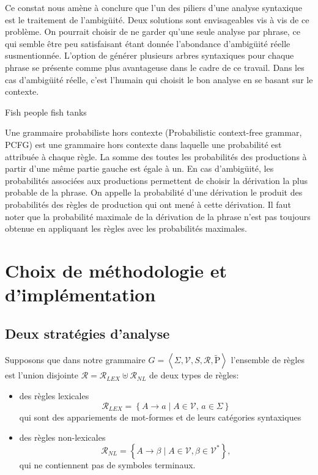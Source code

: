 \documentclass[12pt]{article}
\begin{document}
Ce constat nous am\`ene \`a conclure que l'un des piliers d'une
analyse syntaxique est le traitement de l'ambig\"uit\'e. Deux solutions sont
envisageables vis \`a vis de ce probl\`eme. On pourrait choisir de ne garder
qu'une seule analyse par phrase, ce qui semble \^etre peu satisfaisant \'etant
donn\'ee l'abondance d'ambig\"uit\'e r\'eelle susmentionn\'ee. L'option de
g\'en\'erer plusieurs arbres syntaxiques pour chaque phrase se pr\'esente comme
plus avantageuse dans le cadre de ce travail. Dans les cas d'ambig\"uit\'e
r\'eelle, c'est l'humain qui choisit le bon analyse en se basant sur le
contexte.

\begin{exe}
\ex Fish people fish tanks
\end{exe}

Une grammaire probabiliste hors contexte (Probabilistic context-free grammar,
PCFG) est une grammaire hors contexte dans laquelle une probabilit\'e est
attribu\'ee \`a chaque r\`egle. La somme des toutes les probabilit\'es des
productions \`a partir d'une m\^eme partie gauche est \'egale \`a un. 
En cas d'ambig\"uit\'e, les probabilit\'es associ\'ees aux productions permettent
de choisir la d\'erivation la plus probable de la phrase. On appelle la
probabilit\'e d'une d\'erivation le produit des probabilit\'es des r\`egles de
production qui ont men\'e \`a cette d\'erivation. Il faut noter que la
probabilit\'e maximale de la d\'erivation de la phrase n'est pas toujours obtenue
en appliquant les r\`egles avec les probabilit\'es maximales.


\section{Choix de m\'ethodologie et d'impl\'ementation}

\subsection{Deux strat\'egies d'analyse}

Supposons que dans notre grammaire $G = \left< \Sigma, \mathscr{V}, S, \mathscr{R}, \tilde{\mathrm{P}} \right>$ l'ensemble de r\`egles est l'union disjointe $\mathscr{R} = \mathscr{R}_{LEX} \uplus \mathscr{R}_{NL}$ de deux types de r\`egles:
\begin{itemize}
\item des r\`egles lexicales
$$\mathscr{R}_{LEX} = \left\{ A \rightarrow a \mid
        A \in \mathscr{V}, \, a \in \Sigma \right\}$$
qui sont des appariements de mot-formes et de leurs cat\'egories syntaxiques
\item des r\`egles non-lexicales
$$\mathscr{R}_{NL} = \left\{ A \rightarrow \beta \mid
     A \in \mathscr{V}, \beta \in \mathscr{V}^* \right\},$$
qui ne contiennent pas de symboles terminaux.
\end{itemize}
\end{document}
